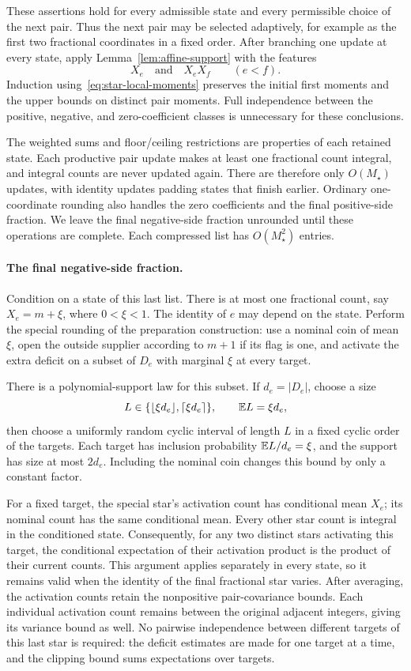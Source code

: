 These assertions hold for every admissible state and every permissible
choice of the next pair. Thus the next pair may be selected adaptively,
for example as the first two fractional coordinates in a fixed order.
After branching one update at every state, apply
Lemma~\ref{lem:affine-support} with the features
\[
   X_e \quad\text{and}\quad X_eX_f \qquad(e<f).
\]
Induction using~\eqref{eq:star-local-moments} preserves the initial
first moments and the upper bounds on distinct pair moments. Full
independence between the positive, negative, and zero-coefficient
classes is unnecessary for these conclusions.

The weighted sums and floor/ceiling restrictions are properties of each
retained state. Each productive pair update makes at least one
fractional count integral, and integral counts are never updated again.
There are therefore only \(O(M_\star)\) updates, with identity updates
padding states that finish earlier. Ordinary one-coordinate rounding
also handles the zero coefficients and the final positive-side
fraction. We leave the final negative-side fraction unrounded until
these operations are complete. Each compressed list has
\(O(M_\star^2)\) entries.

\paragraph{The final negative-side fraction.}
Condition on a state of this last list. There is at most one fractional
count, say \(X_e=m+\xi\), where \(0<\xi<1\). The identity of \(e\)
may depend on the state. Perform the special rounding of the
preparation construction: use a nominal coin of mean \(\xi\), open the
outside supplier according to \(m+1\) if its flag is one, and activate
the extra deficit on a subset of \(D_e\) with marginal \(\xi\) at
every target.

There is a polynomial-support law for this subset. If
\(d_e=|D_e|\), choose a size
\[
 L\in\{\lfloor\xi d_e\rfloor,\lceil\xi d_e\rceil\},
 \qquad \mathbb E L=\xi d_e,
\]
then choose a uniformly random cyclic interval of length \(L\) in a
fixed cyclic order of the targets. Each target has inclusion
probability \(\mathbb E L/d_e=\xi\), and the support has size at most
\(2d_e\). Including the nominal coin changes this bound by only a
constant factor.

For a fixed target, the special star's activation count has conditional
mean \(X_e\); its nominal count has the same conditional mean. Every
other star count is integral in the conditioned state. Consequently,
for any two distinct stars activating this target, the conditional
expectation of their activation product is the product of their
current counts. This argument applies separately in every state, so
it remains valid when the identity of the final fractional star varies.
After averaging, the activation counts retain the nonpositive
pair-covariance bounds. Each individual activation count remains
between the original adjacent integers, giving its variance bound as
well. No pairwise independence between different targets of this last
star is required: the deficit estimates are made for one target at a
time, and the clipping bound sums expectations over targets.

